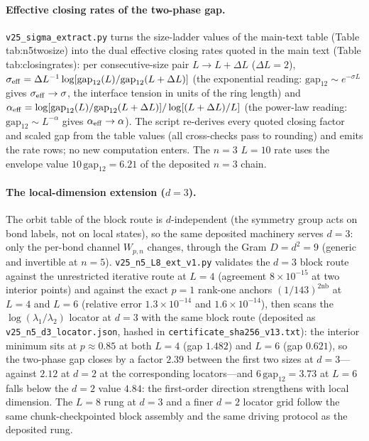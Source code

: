 \documentclass[aps,prx,reprint,superscriptaddress,nobibnotes,longbibliography]{revtex4-2}
\begin{document}
\paragraph{Effective closing rates of the two-phase gap.}
\texttt{v25\_sigma\_extract.py} turns the size-ladder values of the
main-text table (Table tab:n5twosize) into the dual effective closing
rates quoted in the main text (Table tab:closingrates): per
consecutive-size pair $L\to L+\Delta L$ ($\Delta L=2$),
$\sigma_{\rm eff}=\Delta L^{-1}\log[\mathrm{gap}_{12}(L)/\mathrm{gap}_{12}(L+\Delta L)]$
(the exponential reading: $\mathrm{gap}_{12}\sim e^{-\sigma L}$ gives
$\sigma_{\rm eff}\to\sigma$, the interface tension in units of the ring
length) and
$\alpha_{\rm eff}=\log[\mathrm{gap}_{12}(L)/\mathrm{gap}_{12}(L+\Delta L)]/\log[(L+\Delta L)/L]$
(the power-law reading: $\mathrm{gap}_{12}\sim L^{-\alpha}$ gives
$\alpha_{\rm eff}\to\alpha$).  The script re-derives every quoted
closing factor and scaled gap from the table values (all cross-checks
pass to rounding) and emits the rate rows; no new computation enters.
The $n=3$ $L=10$ rate uses the envelope value
$10\,\mathrm{gap}_{12}=6.21$ of the deposited $n=3$ chain.

\paragraph{The local-dimension extension ($d=3$).}
The orbit table of the block route is $d$-independent (the symmetry
group acts on bond labels, not on local states), so the same deposited
machinery serves $d=3$: only the per-bond channel $W_{p,n}$ changes,
through the Gram $D=d^2=9$ (generic and invertible at $n=5$).
\texttt{v25\_n5\_L8\_ext\_v1.py} validates the $d=3$ block route
against the unrestricted iterative route at $L=4$ (agreement
$8\times10^{-15}$ at two interior points) and against the exact $p=1$
rank-one anchors $(1/143)^{2\mathrm{nb}}$ at $L=4$ and $L=6$ (relative
error $1.3\times10^{-14}$ and $1.6\times10^{-14}$), then scans the
$\log(\lambda_1/\lambda_2)$ locator at $d=3$ with the same block route
(deposited as \texttt{v25\_n5\_d3\_locator.json}, hashed in
\texttt{certificate\_sha256\_v13.txt}): the interior minimum sits at
$p\approx0.85$ at both $L=4$ (gap $1.482$) and $L=6$ (gap $0.621$), so
the two-phase gap closes by a factor $2.39$ between the first two sizes
at $d=3$---against $2.12$ at $d=2$ at the corresponding locators---and
$6\,\mathrm{gap}_{12}=3.73$ at $L=6$ falls below the $d=2$ value
$4.84$: the first-order direction strengthens with local dimension.
The $L=8$ rung at $d=3$ and a finer $d=2$ locator grid follow the same
chunk-checkpointed block assembly and the same driving protocol as the
deposited rung.
\end{document}
